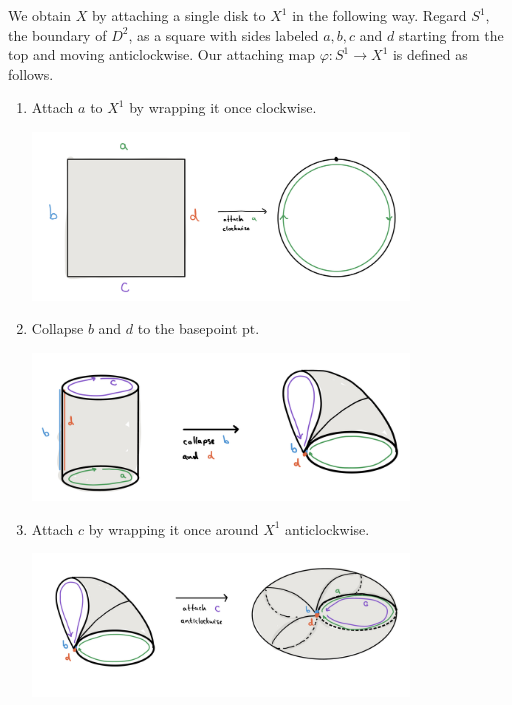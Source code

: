 \begin{homework}[e]
\begin{prf}
    We obtain $X$ by attaching a single disk to $X^1$ in the following way. Regard $S^1$, the boundary of $D^2$, as a square with sides labeled $a,b,c$ and $d$ starting from the top and moving anticlockwise. Our attaching map $\varphi:S^1 \to X^1$ is defined as follows.
    \begin{enumerate}
      \item Attach $a$ to $X^1$ by wrapping it once clockwise.
        \begin{center}
          \includegraphics[width=10cm]{figures/hwk3-fig1.jpg}
          \label{fig:prob7.1}
        \end{center}
      \item Collapse $b$ and $d$ to the basepoint $\text{pt}$.
        \begin{center}
          \includegraphics[width=10cm]{figures/hwk3-fig2.jpg}
          \label{fig:prob7.2}
        \end{center}
      \item Attach $c$ by wrapping it once around $X^1$ anticlockwise.
        \begin{center}
          \includegraphics[width=10cm]{figures/hwk3-fig3.jpg}

\end{center}
\end{enumerate}
\end{prf}
\end{homework}
